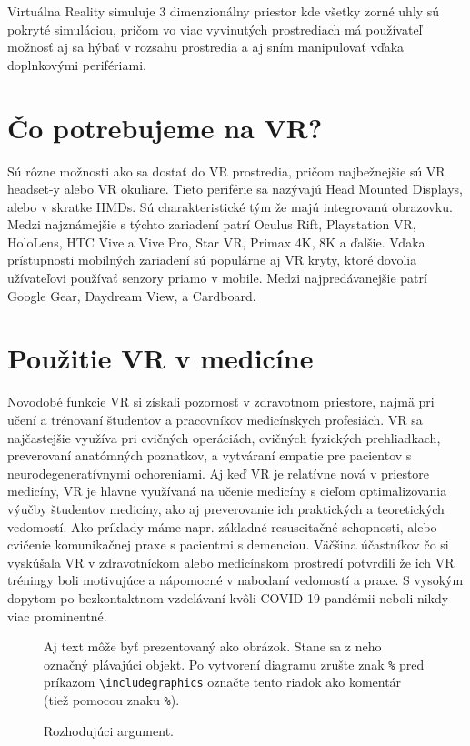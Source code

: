 \documentclass[10pt,twoside,slovak,a4paper]{article}
\begin{document}
Virtuálna Reality simuluje 3 dimenzionálny priestor kde všetky zorné uhly sú pokryté simuláciou, pričom vo viac vyvinutých prostrediach má používateľ možnosť aj sa hýbať v rozsahu prostredia a aj sním manipulovať vďaka doplnkovými perifériami.

\section{Čo potrebujeme na VR?} \label{Devices}

Sú rôzne možnosti ako sa dostať do VR prostredia, pričom najbežnejšie sú VR headset-y alebo VR okuliare.
Tieto periférie sa nazývajú Head Mounted Displays, alebo v skratke HMDs. Sú charakteristické tým že majú integrovanú obrazovku. Medzi najznámejšie s týchto zariadení patrí Oculus Rift, Playstation VR, HoloLens, HTC Vive a Vive Pro, Star VR, Primax 4K, 8K a ďalšie.
Vďaka prístupnosti mobilných zariadení sú populárne aj VR kryty, ktoré dovolia užívateľovi používať senzory priamo v mobile. Medzi najpredávanejšie patrí Google Gear, Daydream View, a Cardboard.

\section{Použitie VR v medicíne} \label{Usecase}

Novodobé funkcie VR si získali pozornosť v zdravotnom priestore, najmä pri učení a trénovaní študentov a pracovníkov medicínskych profesiách. VR sa najčastejšie využíva pri cvičných operáciách, cvičných fyzických prehliadkach, preverovaní anatómných poznatkov, a vytváraní empatie pre pacientov s neurodegeneratívnymi ochoreniami. Aj keď VR je relatívne nová v priestore medicíny, VR je hlavne využívaná na učenie medicíny s cieľom optimalizovania výučby študentov medicíny, ako aj preverovanie ich praktických a teoretických vedomostí. Ako príklady máme napr. základné resuscitačné schopnosti, alebo cvičenie komunikačnej praxe s pacientmi s demenciou. Väčšina účastníkov čo si vyskúšala VR v zdravotníckom alebo medicínskom prostredí potvrdili že ich VR tréningy boli motivujúce a nápomocné v nabodaní vedomostí a praxe. S vysokým dopytom po bezkontaktnom vzdelávaní kvôli COVID-19 pandémii neboli nikdy viac prominentné.

\begin{figure*}[tbh]
\centering
Aj text môže byť prezentovaný ako obrázok. Stane sa z neho označný plávajúci objekt. Po vytvorení diagramu zrušte znak \texttt{\%} pred príkazom \verb|\includegraphics| označte tento riadok ako komentár (tiež pomocou znaku \texttt{\%}).
\caption{Rozhodujúci argument.}
\label{f:rozhod}
\end{figure*}
\end{document}
